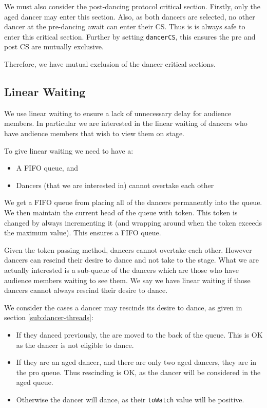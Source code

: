 \documentclass[12pt,a4paper]{scrartcl}
\begin{document}
We must also consider the post-dancing protocol critical section.
Firstly, only the aged dancer may enter this section.
Also, as both dancers are selected, no other dancer at the pre-dancing await can enter their CS.
Thus is is always safe to enter this critical section.
Further by setting \texttt{dancerCS}, this ensures the pre and post CS are mutually exclusive.

Therefore, we have mutual exclusion of the dancer critical sections.

\subsection{Linear Waiting}
We use linear waiting to ensure a lack of unnecessary delay for audience members.
In particular we are interested in the linear waiting of dancers who have audience members that wish to view them on stage.

To give linear waiting we need to have a:
\begin{itemize}
    \item A FIFO queue, and
    \item Dancers (that we are interested in) cannot overtake each other
\end{itemize}

We get a FIFO queue from placing all of the dancers permanently into the queue.
We then maintain the current head of the queue with token.
This token is changed by always incrementing it (and wrapping around when the token exceeds the maximum value).
This ensures a FIFO queue.

Given the token passing method, dancers cannot overtake each other.
However dancers can rescind their desire to dance and not take to the stage.
What we are actually interested is a sub-queue of the dancers which are those who have audience members waiting to see them.
We say we have linear waiting if those dancers cannot always rescind their desire to dance.

We consider the cases a dancer may rescinds its desire to dance, as given in section \ref{sub:dancer-threads}:
\begin{itemize}
    \item If they danced previously, the are moved to the back of the queue. This is OK as the dancer is not eligible to dance.
    \item If they are an aged dancer, and there are only two aged dancers, they are in the pro queue.
          Thus rescinding is OK, as the dancer will be considered in the aged queue.
    \item Otherwise the dancer will dance, as their \texttt{toWatch} value will be positive.
\end{itemize}
\end{document}
